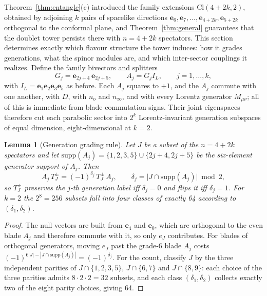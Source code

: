 \documentclass{birkjour}
\newtheorem{lem}[thm]{Lemma}
\theoremstyle{definition}
\theoremstyle{remark}
\numberwithin{equation}{section}
\newcommand{\Cl}{\mathrm{Cl}}
\newcommand{\e}[1]{\bm{e}_{#1}}
\newcommand{\no}{n_{\mathrm{o}}}
\newcommand{\ninf}{n_{\infty}}
\newenvironment{revblock}{}{}
\begin{document}
\begin{revblock}
Theorem~\ref{thm:entangle}(c) introduced the family
extensions $\Cl(4+2k,2)$, obtained by adjoining $k$ pairs
of spacelike directions $\e{6},\e{7},\ldots,\e{4+2k},\e{5+2k}$
orthogonal to the conformal plane, and
Theorem~\ref{thm:general} guarantees that the doublet tower
persists there with $n=4+2k$ spectators. This section
determines exactly which flavour structure the tower
induces: how it grades generations, what the spinor modules
are, and which inter-sector couplings it realizes. Define
the family bivectors and splitters
\begin{equation}\label{eq:family}
G_j=\e{2j+4}\,\e{2j+5},\qquad
A_j=G_jI_L,\qquad j=1,\ldots,k,
\end{equation}
with $I_L=\e{1}\e{2}\e{3}\e{5}$ as before. Each $A_j$
squares to $+1$, and the $A_j$ commute with one another,
with $D$, with $\no$ and $\ninf$, and with every Lorentz
generator $M_{\mu\nu}$; all of this is immediate from blade
commutation signs. Their joint
eigenspaces therefore cut each parabolic sector into $2^k$
Lorentz-invariant generation subspaces of equal dimension,
eight-dimensional at $k=2$.

\begin{lem}[Generation grading rule]\label{lem:grading}
Let $J$ be a subset of the $n=4+2k$ spectators and let
$\mathrm{supp}(A_j)=\{1,2,3,5\}\cup\{2j+4,2j+5\}$ be the
six-element generator support of $A_j$. Then
\begin{equation}\label{eq:grading}
A_j\,T^\pm_J=(-1)^{\delta_j}\,T^\pm_J\,A_j,
\qquad
\delta_j=\bigl|J\cap\mathrm{supp}(A_j)\bigr|\bmod 2,
\end{equation}
so $T^\pm_J$ preserves the $j$-th generation label iff
$\delta_j=0$ and flips it iff $\delta_j=1$. For $k=2$ the
$2^8=256$ subsets fall into four classes of exactly 64
according to $(\delta_1,\delta_2)$.
\end{lem}

\begin{proof}
The null vectors are built from $\e{4}$ and $\e{0}$, which
are orthogonal to the even blade $A_j$ and therefore
commute with it, so only $e_J$ contributes. For blades of
orthogonal generators, moving $e_J$ past the grade-6 blade
$A_j$ costs
$(-1)^{6|J|-|J\cap\mathrm{supp}(A_j)|}=(-1)^{\delta_j}$.
For the count, classify $J$ by the three independent
parities of $J\cap\{1,2,3,5\}$, $J\cap\{6,7\}$ and
$J\cap\{8,9\}$: each choice of the three parities admits
$8\cdot2\cdot2=32$ subsets, and each class
$(\delta_1,\delta_2)$ collects exactly two of the eight
parity choices, giving 64.
\end{proof}


\end{revblock}
\end{document}
